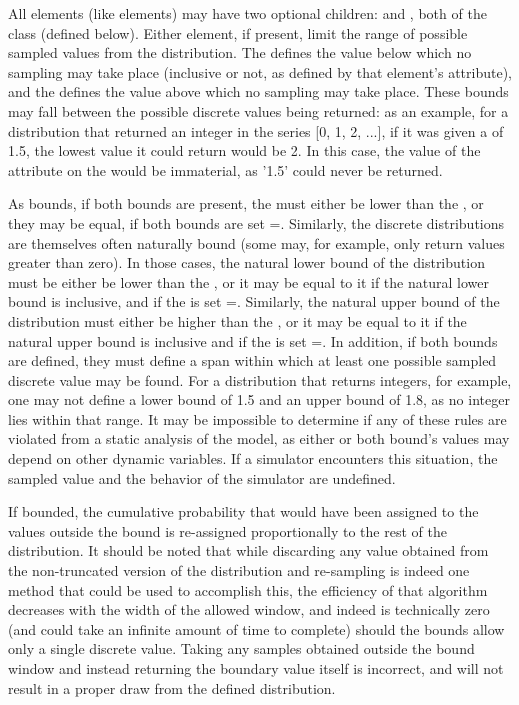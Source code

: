 All \DiscreteUnivariateDistribution elements (like \ContinuousUnivariateDistribution elements) may have two optional children:  and , both of the class \UncertBound (defined below).  Either element, if present, limit the range of possible sampled values from the distribution.  The  defines the value below which no sampling may take place
(inclusive or not, as defined by that element's  attribute), and the  defines the value above which no sampling may take place.  These bounds may fall between the possible discrete values being returned:  as an example, for a distribution that returned an integer in the series [0, 1, 2, ...], if it was given a  of 1.5, the lowest value it could return would be 2.  In this case, the value of the  attribute on the \UncertBound would be immaterial, as '1.5' could never be returned.

As  \ContinuousUnivariateDistribution bounds, if both bounds are present, the  must either be lower than the , or they may be equal, if both bounds are set =.  Similarly, the discrete distributions are themselves often naturally bound (some may, for example, only return values greater than zero).  In those cases, the natural lower bound of the distribution must be either be lower than the , or it may be equal to it if the natural lower bound is inclusive, and if the  is set =.  Similarly, the natural upper bound of the distribution must either be higher than the , or it may be equal to it if the natural upper bound is inclusive and if the  is set =.  In addition, if both bounds are defined, they must define a span within which at least one possible sampled discrete value may be found.  For a distribution that returns integers, for example, one may not define a lower bound of 1.5 and an upper bound of 1.8, as no integer lies within that range.  It may be impossible to determine if any of these rules are violated from a static analysis of the model, as either or both bound's values may depend on other dynamic variables.  If a simulator encounters this situation, the sampled value and the behavior of the simulator are undefined.

If bounded, the cumulative probability that would have been assigned to the values outside the bound is re-assigned proportionally to the rest of the distribution.  It should be noted that while discarding any value obtained from the non-truncated version of the distribution and re-sampling is indeed one method that could be used to accomplish this, the efficiency of that algorithm decreases with the width of the allowed window, and indeed is technically zero (and could take an infinite amount of time to complete) should the bounds allow only a single discrete value.  Taking any samples obtained outside the bound window and instead returning the boundary value itself is incorrect, and will not result in a proper draw from the defined distribution.

